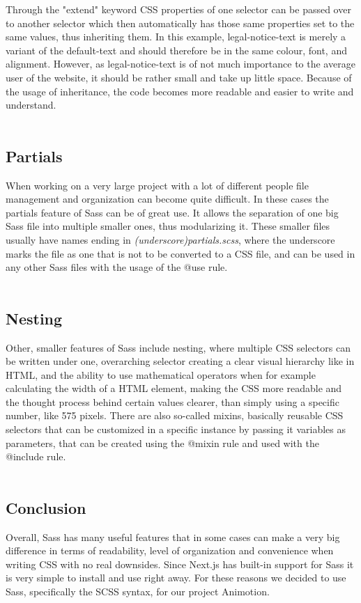 Through the "extend" keyword CSS properties of one selector can be passed over to another selector which then automatically has those 
same properties set to the same values, thus inheriting them. In this example, legal-notice-text is merely a variant of the 
default-text and should therefore be in the same colour, font, and alignment. However, as legal-notice-text is of not much 
importance to the average user of the website, it should be rather small and take up little space. Because of the usage of 
inheritance, the code becomes more readable and easier to write and understand. \cite{SassFeatures}
\\
\\
\subsection{Partials}
When working on a very large project with a lot of different people file management and organization can become quite difficult. In
these cases the partials feature of Sass can be of great use. It allows the separation of one big Sass file into multiple smaller ones,
thus modularizing it. These smaller files usually have names ending in \emph{(underscore)partials.scss}, where the underscore marks the file as one
that is not to be converted to a CSS file, and can be used in any other Sass files with the usage of the @use rule. \cite{SassFeatures}
\\
\\
\subsection{Nesting}
Other, smaller features of Sass include nesting, where multiple CSS selectors can be written under one, overarching selector creating a
clear visual hierarchy like in HTML, and the ability to use mathematical operators when for example calculating the width of a HTML
element, making the CSS more readable and the thought process behind certain values clearer, than simply using a specific number, like
575 pixels. There are also so-called mixins, basically reusable CSS selectors that can be customized in a specific instance by passing it
variables as parameters, that can be created using the @mixin rule and used with the @include rule. \cite{SassFeatures}
\\
\\
\subsection{Conclusion}
Overall, Sass has many useful features that in some cases can make a very big difference in terms of readability, level of organization and
convenience when writing CSS with no real downsides. Since Next.js has built-in support for Sass it is very simple to install and use right
away. For these reasons we decided to use Sass, specifically the SCSS syntax, for our project Animotion. \cite{NextjsCSSSupport}
\\
\\
